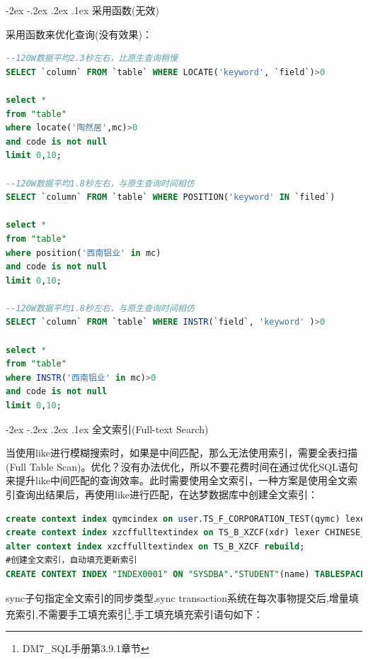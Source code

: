 \documentclass[12pt]{book}
\makeatletter
\numberwithin{dummy}{section}
\theoremstyle{ocrenumbox}
\theoremstyle{blacknumex}
\theoremstyle{blacknumbox}
\theoremstyle{ocrenum}
\renewcommand\paragraph{\@startsection{paragraph}{4}{\z@}
	{-2ex \@plus-.2ex \@minus .2ex}
	{.1ex}
	{\normalfont\small\sffamily\bfseries}}
\makeatother
\begin{document}
\paragraph{采用函数(无效)}

采用函数来优化查询(没有效果)：

\begin{lstlisting}[language=SQL]
--120W数据平均2.3秒左右，比原生查询稍慢
SELECT `column` FROM `table` WHERE LOCATE('keyword', `field`)>0

select * 
from "table" 
where locate('陶然居',mc)>0
and code is not null
limit 0,10;

--120W数据平均1.8秒左右，与原生查询时间相仿
SELECT `column` FROM `table` WHERE POSITION('keyword' IN `filed`)

select * 
from "table" 
where position('西南铝业' in mc)
and code is not null
limit 0,10;

--120W数据平均1.8秒左右，与原生查询时间相仿
SELECT `column` FROM `table` WHERE INSTR(`field`, 'keyword' )>0

select * 
from "table" 
where INSTR('西南铝业' in mc)>0
and code is not null
limit 0,10;
\end{lstlisting}

\paragraph{全文索引(Full-text Search)}

当使用like进行模糊搜索时，如果是中间匹配，那么无法使用索引，需要全表扫描(Full Table Scan)。优化？没有办法优化，所以不要花费时间在通过优化SQL语句来提升like中间匹配的查询效率。此时需要使用全文索引，一种方案是使用全文索引查询出结果后，再使用like进行匹配，在达梦数据库中创建全文索引：

\begin{lstlisting}[language=SQL]
create context index qymcindex on user.TS_F_CORPORATION_TEST(qymc) lexer CHINESE_VGRAM_LEXER SYNC TRANSACTION;
create context index xzcffulltextindex on TS_B_XZCF(xdr) lexer CHINESE_VGRAM_LEXER;
alter context index xzcffulltextindex on TS_B_XZCF rebuild;
#创建全文索引，自动填充更新索引
CREATE CONTEXT INDEX "INDEX0001" ON "SYSDBA"."STUDENT"(name) TABLESPACE "MAIN" LEXER CHINESE_LEXER  SYNC TRANSACTION;
\end{lstlisting}

sync子句指定全文索引的同步类型,sync transaction系统在每次事物提交后,增量填充索引,不需要手工填充索引\footnote{DM7\_SQL手册第3.9.1章节},手工填充填充索引语句如下：
\end{document}

